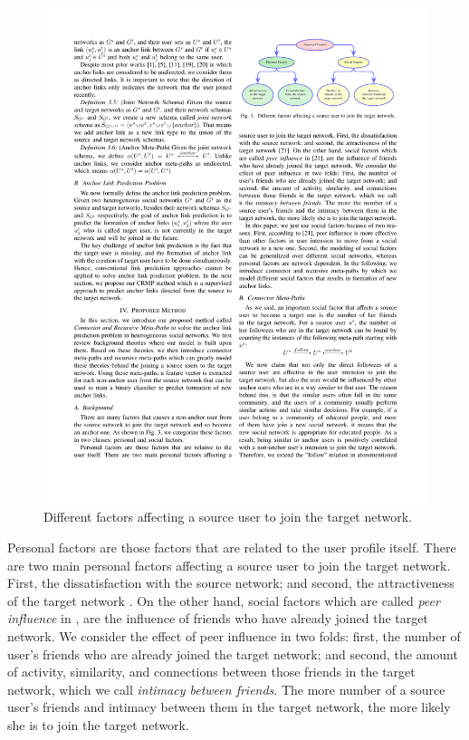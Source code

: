 \documentclass[conference]{IEEEtran}
\begin{document}
\begin{figure}
\includegraphics[scale=1]{factors.pdf}
\caption{Different factors affecting a source user to join the target network.}
\label{fig:factors}
\end{figure}

Personal factors are those factors that are related to the user profile itself. There are two main personal factors affecting a source user to join the target network. First, the dissatisfaction with the source network; and second, the attractiveness of the target network \cite{xu2014retaining}.
On the other hand, social factors which are called \textit{peer influence} in \cite{xu2014retaining}, are the influence of friends who have already joined the target network. We consider the effect of peer influence in two folds: first, the number of user's friends who are already joined the target network; and second, the amount of activity, similarity, and connections between those friends in the target network, which we call \textit{intimacy between friends}. The more number of a source user's friends and intimacy between them in the target network, the more likely she is to join the target network.
\end{document}
